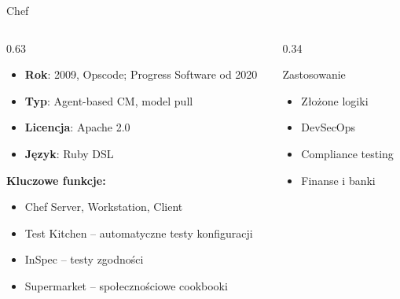 \documentclass{beamer}
\begin{document}
\begin{frame}{Chef}
    \begin{columns}[T]
        \begin{column}{0.63\textwidth}
            \begin{itemize}
                \item \textbf{Rok}: 2009, Opscode; Progress Software od 2020
                \item \textbf{Typ}: Agent-based CM, model pull
                \item \textbf{Licencja}: Apache 2.0
                \item \textbf{J\k{e}zyk}: Ruby DSL
            \end{itemize}
            \vspace{0.4em}
            \textbf{Kluczowe funkcje:}
            \begin{itemize}
                \item Chef Server, Workstation, Client
                \item Test Kitchen -- automatyczne testy konfiguracji
                \item InSpec -- testy zgodno\'sci
                \item Supermarket -- spo\l{}eczno\'sciowe cookbooki
            \end{itemize}
        \end{column}
        \begin{column}{0.34\textwidth}
            \begin{block}{Zastosowanie}
                \begin{itemize}
                    \item Z\l{}o\.zone logiki
                    \item DevSecOps
                    \item Compliance testing
                    \item Finanse i banki
                \end{itemize}
            \end{block}
        \end{column}
    \end{columns}
\end{frame}
\end{document}
